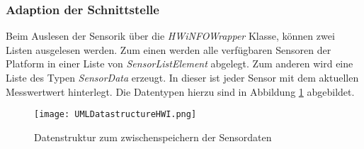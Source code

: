 \subsubsection*{Adaption der Schnittstelle}
Beim Auslesen der Sensorik über die \textit{HWiNFOWrapper} Klasse, können zwei Listen ausgelesen werden. Zum einen werden alle verfügbaren Sensoren der Platform in einer Liste von \textit{SensorListElement} abgelegt. Zum anderen wird eine Liste des Typen \textit{SensorData} erzeugt. In dieser ist jeder Sensor mit dem aktuellen Messwertwert hinterlegt. Die Datentypen hierzu sind in Abbildung \ref{fig:DatastructuresUML} abgebildet.      
\begin{center}
    \begin{figure}[h!]
        \centering
        \texttt{[image: UMLDatastructureHWI.png]}
        \caption{Datenstruktur zum zwischenspeichern der Sensordaten}
        \label{fig:DatastructuresUML}
    \end{figure}
\end{center}
\vspace{-1.8cm}

